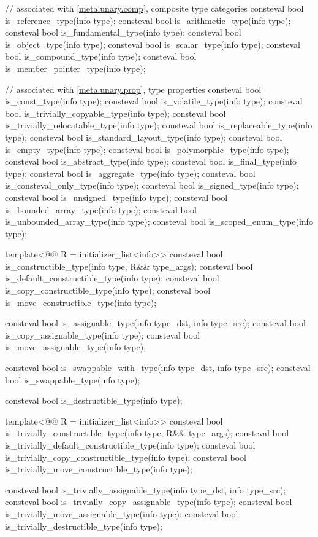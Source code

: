 \begin{codeblock}
{  // associated with \ref{meta.unary.comp}, composite type categories
  consteval bool is_reference_type(info type);
  consteval bool is_arithmetic_type(info type);
  consteval bool is_fundamental_type(info type);
  consteval bool is_object_type(info type);
  consteval bool is_scalar_type(info type);
  consteval bool is_compound_type(info type);
  consteval bool is_member_pointer_type(info type);

  // associated with \ref{meta.unary.prop}, type properties
  consteval bool is_const_type(info type);
  consteval bool is_volatile_type(info type);
  consteval bool is_trivially_copyable_type(info type);
  consteval bool is_trivially_relocatable_type(info type);
  consteval bool is_replaceable_type(info type);
  consteval bool is_standard_layout_type(info type);
  consteval bool is_empty_type(info type);
  consteval bool is_polymorphic_type(info type);
  consteval bool is_abstract_type(info type);
  consteval bool is_final_type(info type);
  consteval bool is_aggregate_type(info type);
  consteval bool is_consteval_only_type(info type);
  consteval bool is_signed_type(info type);
  consteval bool is_unsigned_type(info type);
  consteval bool is_bounded_array_type(info type);
  consteval bool is_unbounded_array_type(info type);
  consteval bool is_scoped_enum_type(info type);

  template<@@ R = initializer_list<info>>
    consteval bool is_constructible_type(info type, R&& type_args);
  consteval bool is_default_constructible_type(info type);
  consteval bool is_copy_constructible_type(info type);
  consteval bool is_move_constructible_type(info type);

  consteval bool is_assignable_type(info type_dst, info type_src);
  consteval bool is_copy_assignable_type(info type);
  consteval bool is_move_assignable_type(info type);

  consteval bool is_swappable_with_type(info type_dst, info type_src);
  consteval bool is_swappable_type(info type);

  consteval bool is_destructible_type(info type);

  template<@@ R = initializer_list<info>>
    consteval bool is_trivially_constructible_type(info type, R&& type_args);
  consteval bool is_trivially_default_constructible_type(info type);
  consteval bool is_trivially_copy_constructible_type(info type);
  consteval bool is_trivially_move_constructible_type(info type);

  consteval bool is_trivially_assignable_type(info type_dst, info type_src);
  consteval bool is_trivially_copy_assignable_type(info type);
  consteval bool is_trivially_move_assignable_type(info type);
  consteval bool is_trivially_destructible_type(info type);

}
\end{codeblock}
